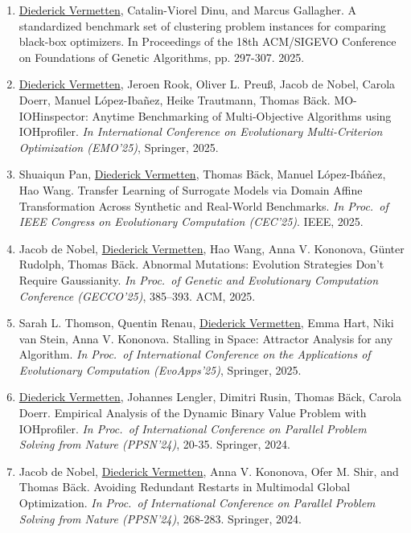 \begin{enumerate}
    \item \underline{Diederick Vermetten}, Catalin-Viorel Dinu, and Marcus Gallagher.  A standardized benchmark set of clustering problem instances for comparing black-box optimizers. In Proceedings of the 18th ACM/SIGEVO Conference on Foundations of Genetic Algorithms, pp. 297-307. 2025.

    \item \underline{Diederick Vermetten}, Jeroen Rook, Oliver L. Preu\ss, Jacob de Nobel, Carola Doerr, Manuel L\'opez-Iba\~nez, Heike Trautmann, Thomas B\"ack. MO-IOHinspector: Anytime Benchmarking of Multi-Objective Algorithms using IOHprofiler.
    \emph{In International Conference on Evolutionary Multi-Criterion Optimization (EMO'25)}, Springer, 2025.

    \item  Shuaiqun Pan, \underline{Diederick Vermetten}, Thomas B\"ack, Manuel López-Ibáñez, Hao Wang. Transfer Learning of Surrogate Models via Domain Affine Transformation Across Synthetic and Real-World Benchmarks.
    \emph{In Proc.~of  IEEE Congress on Evolutionary Computation (CEC'25)}. IEEE, 2025.

    \item Jacob de Nobel, \underline{Diederick Vermetten}, Hao Wang, Anna V. Kononova, Günter Rudolph, Thomas B\"ack. Abnormal Mutations: Evolution Strategies Don't Require Gaussianity.
    \emph{In Proc.~of Genetic and Evolutionary Computation Conference (GECCO'25)}, 385–393. ACM, 2025.
    
    \item Sarah L. Thomson, Quentin Renau, \underline{Diederick Vermetten}, Emma Hart, Niki van Stein, Anna V. Kononova. Stalling in Space: Attractor Analysis for any Algorithm. 
    \emph{In Proc.~of International Conference on the Applications of Evolutionary Computation (EvoApps'25)}, Springer, 2025.
    
    \item \underline{Diederick Vermetten}, Johannes Lengler, Dimitri Rusin, Thomas Bäck, Carola Doerr. Empirical Analysis of the Dynamic Binary Value Problem with IOHprofiler.
    \emph{In Proc.~of International Conference on Parallel Problem Solving from Nature (PPSN'24)}, 20-35. Springer, 2024.
    
    \item Jacob de Nobel, \underline{Diederick Vermetten}, Anna V. Kononova, Ofer M. Shir, and Thomas B\"ack. Avoiding Redundant Restarts in Multimodal Global Optimization.
    \emph{In Proc.~of International Conference on Parallel Problem Solving from Nature (PPSN'24)}, 268-283. Springer, 2024.
    

\end{enumerate}

